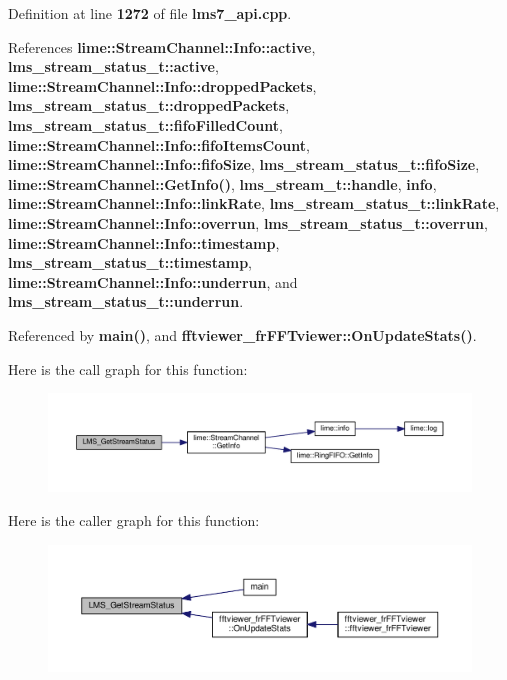 Definition at line {\bf 1272} of file {\bf lms7\+\_\+api.\+cpp}.



References {\bf lime\+::\+Stream\+Channel\+::\+Info\+::active}, {\bf lms\+\_\+stream\+\_\+status\+\_\+t\+::active}, {\bf lime\+::\+Stream\+Channel\+::\+Info\+::dropped\+Packets}, {\bf lms\+\_\+stream\+\_\+status\+\_\+t\+::dropped\+Packets}, {\bf lms\+\_\+stream\+\_\+status\+\_\+t\+::fifo\+Filled\+Count}, {\bf lime\+::\+Stream\+Channel\+::\+Info\+::fifo\+Items\+Count}, {\bf lime\+::\+Stream\+Channel\+::\+Info\+::fifo\+Size}, {\bf lms\+\_\+stream\+\_\+status\+\_\+t\+::fifo\+Size}, {\bf lime\+::\+Stream\+Channel\+::\+Get\+Info()}, {\bf lms\+\_\+stream\+\_\+t\+::handle}, {\bf info}, {\bf lime\+::\+Stream\+Channel\+::\+Info\+::link\+Rate}, {\bf lms\+\_\+stream\+\_\+status\+\_\+t\+::link\+Rate}, {\bf lime\+::\+Stream\+Channel\+::\+Info\+::overrun}, {\bf lms\+\_\+stream\+\_\+status\+\_\+t\+::overrun}, {\bf lime\+::\+Stream\+Channel\+::\+Info\+::timestamp}, {\bf lms\+\_\+stream\+\_\+status\+\_\+t\+::timestamp}, {\bf lime\+::\+Stream\+Channel\+::\+Info\+::underrun}, and {\bf lms\+\_\+stream\+\_\+status\+\_\+t\+::underrun}.



Referenced by {\bf main()}, and {\bf fftviewer\+\_\+fr\+F\+F\+Tviewer\+::\+On\+Update\+Stats()}.



Here is the call graph for this function\+:
\nopagebreak
\begin{figure}[H]
\begin{center}
\leavevmode
\includegraphics[width=350pt]{df/de1/lms7__api_8cpp_a3fb6de3c631d876585f137ca3c03a7d9_cgraph}
\end{center}
\end{figure}




Here is the caller graph for this function\+:
\nopagebreak
\begin{figure}[H]
\begin{center}
\leavevmode
\includegraphics[width=350pt]{df/de1/lms7__api_8cpp_a3fb6de3c631d876585f137ca3c03a7d9_icgraph}
\end{center}
\end{figure}


